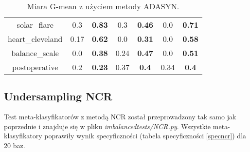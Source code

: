\begin{table}[H]
\begin{center}
{\begin{tabular}{c|cccccc}
					solar\_flare&0.3&\textbf{0.83}&0.3&\textbf{0.46}&0.0&\textbf{0.71}\\%
					heart\_cleveland&0.17&\textbf{0.62}&0.0&\textbf{0.31}&0.0&\textbf{0.58}\\%
					balance\_scale&0.0&\textbf{0.38}&0.24&\textbf{0.47}&0.0&\textbf{0.51}\\%
					postoperative&0.2&\textbf{0.23}&0.37&\textbf{0.4}&0.34&\textbf{0.4}\\%
				\end{tabular}}
				\caption{Miara G-mean z użyciem metody ADASYN.}
				\label{gmeanadasyn}
			\end{center}
		\end{table}
		
\subsection{Undersampling NCR}
Test meta-klasyfikatorów z metodą NCR został przeprowadzony tak samo jak poprzednie i znajduje się w pliku \textit{imbalancedtests/NCR.py}. Wszystkie meta-klasyfikatory poprawiły wynik specyficzności (tabela specyficzności \ref{specncr}) dla 20 baz.
